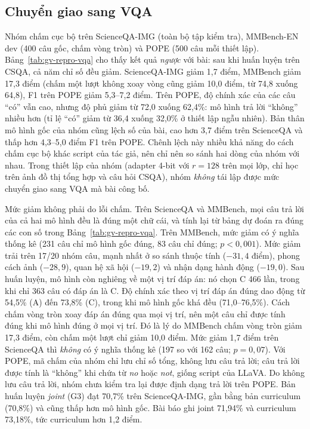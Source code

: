 \subsection{Chuyển giao sang VQA}
Nhóm chấm cục bộ trên ScienceQA-IMG (toàn bộ tập kiểm tra), MMBench-EN dev (400 câu gốc, chấm vòng tròn) và POPE (500 câu mỗi thiết lập). Bảng~\ref{tab:gv-repro-vqa} cho thấy kết quả \emph{ngược} với bài: sau khi huấn luyện trên CSQA, cả năm chỉ số đều giảm. ScienceQA-IMG giảm 1,7 điểm, MMBench giảm 17,3 điểm (chấm một lượt không xoay vòng cũng giảm 10,0 điểm, từ 74,8 xuống 64,8), F1 trên POPE giảm 5,3--7,2 điểm. Trên POPE, độ chính xác của các câu ``có'' vẫn cao, nhưng độ phủ giảm từ 72,0 xuống 62,4\%: mô hình trả lời ``không'' nhiều hơn (tỉ lệ ``có'' giảm từ 36,4 xuống 32,0\% ở thiết lập ngẫu nhiên). Bản thân mô hình gốc của nhóm cũng lệch số của bài, cao hơn 3,7 điểm trên ScienceQA và thấp hơn 4,3--5,0 điểm F1 trên POPE. Chênh lệch này nhiều khả năng do cách chấm cục bộ khác script của tác giả, nên chỉ nên so sánh hai dòng của nhóm với nhau. Trong thiết lập của nhóm (adapter 4-bit với $r=128$ trên mọi lớp, chỉ học trên ảnh đồ thị tổng hợp và câu hỏi CSQA), nhóm \emph{không} tái lập được mức chuyển giao sang VQA mà bài công bố.

Mức giảm không phải do lỗi chấm. Trên ScienceQA và MMBench, mọi câu trả lời của cả hai mô hình đều là đúng một chữ cái, và tính lại từ bảng dự đoán ra đúng các con số trong Bảng~\ref{tab:gv-repro-vqa}. Trên MMBench, mức giảm có ý nghĩa thống kê (231 câu chỉ mô hình gốc đúng, 83 câu chỉ \GV{} đúng; $p<0{,}001$). Mức giảm trải trên 17/20 nhóm câu, mạnh nhất ở so sánh thuộc tính ($-31{,}4$ điểm), phong cách ảnh ($-28{,}9$), quan hệ xã hội ($-19{,}2$) và nhận dạng hành động ($-19{,}0$). Sau huấn luyện, mô hình còn nghiêng về một vị trí đáp án: nó chọn C 466 lần, trong khi chỉ 363 câu có đáp án là C. Độ chính xác theo vị trí đáp án đúng dao động từ 54,5\% (A) đến 73,8\% (C), trong khi mô hình gốc khá đều (71,0--76,5\%). Cách chấm vòng tròn xoay đáp án đúng qua mọi vị trí, nên một câu chỉ được tính đúng khi mô hình đúng ở mọi vị trí. Đó là lý do MMBench chấm vòng tròn giảm 17,3 điểm, còn chấm một lượt chỉ giảm 10,0 điểm. Mức giảm 1,7 điểm trên ScienceQA thì \emph{không} có ý nghĩa thống kê (197 so với 162 câu; $p=0{,}07$). Với POPE, mã chấm của nhóm chỉ lưu chỉ số tổng, không lưu câu trả lời; câu trả lời được tính là ``không'' khi chứa từ \emph{no} hoặc \emph{not}, giống script của LLaVA. Do không lưu câu trả lời, nhóm chưa kiểm tra lại được định dạng trả lời trên POPE. Bản huấn luyện \emph{joint} (G3) đạt 70,7\% trên ScienceQA-IMG, gần bằng bản curriculum (70,8\%) và cũng thấp hơn mô hình gốc. Bài báo ghi joint 71,94\% và curriculum 73,18\%, tức curriculum hơn 1,2 điểm. 

